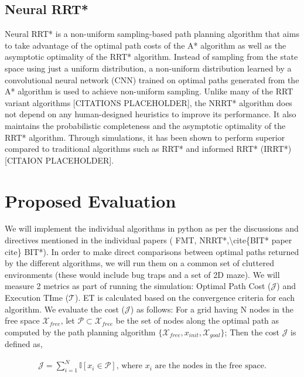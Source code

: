 \documentclass{article}
\begin{document}
\subsection{Neural RRT*}
Neural RRT* is a non-uniform sampling-based path planning algorithm that aims to take advantage of the optimal path costs of the A* algorithm as well as the asymptotic optimality of the RRT* algorithm. Instead of sampling from the state space using just a uniform distribution, a non-uniform distribution learned by a convolutional neural network (CNN) trained on optimal paths generated from the A* algorithm is used to achieve non-uniform sampling. Unlike many of the RRT variant algorithms [CITATIONS PLACEHOLDER], the NRRT* algorithm does not depend on any human-designed heuristics to improve its performance. It also maintains the probabilistic completeness and the asymptotic optimality of the RRT* algorithm. Through simulations, it has been shown to perform superior compared to traditional algorithms such as RRT* and informed RRT* (IRRT*) [CITAION PLACEHOLDER].


    


\section{Proposed Evaluation}
\label{sec:Proposed Evaluation}
We will implement the individual algorithms in python as per the discussions and directives mentioned in the individual papers (\cite{FMT} FMT, \citep{nrrt} NRRT*,\textbackslash cite\{BIT* paper cite\} BIT*). In order to make direct comparisons between optimal paths returned by the different algorithms, we will run them on a common set of cluttered environments (these would include bug traps and a set of 2D maze). We will measure 2 metrics as part of running the simulation: Optimal Path Cost ($\mathcal{J}$) and Execution TIme ($\mathcal{T}$). ET is calculated based on the convergence criteria for each algorithm. We evaluate the cost ($\mathcal{J}$) as follows: For a grid having N nodes in the free space $\mathcal{X}_{free}$, let $\mathcal{P} \subset \mathcal{X}_{free}$ be the set of nodes along the optimal path as computed by the path planning algorithm $\{ \mathcal{X}_{free}, x_{init}, \mathcal{X}_{goal}\}$; Then the cost $\mathcal{J}$ is defined as,

\begin{align}
	\mathcal{J} = \sum_{i=1}^{N} \mathbb{I}[ x_i \in \mathcal{P}] \text{, where } x_i \text{ are the nodes in the free space.}
\end{align}
\end{document}
